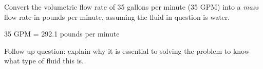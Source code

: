 

Convert the volumetric flow rate of 35 gallons per minute (35 GPM) into a {\it mass} flow rate in pounds per minute, assuming the fluid in question is water.







35 GPM = 292.1 pounds per minute

\vskip 10pt

Follow-up question: explain why it is essential to solving the problem to know what type of fluid this is.










